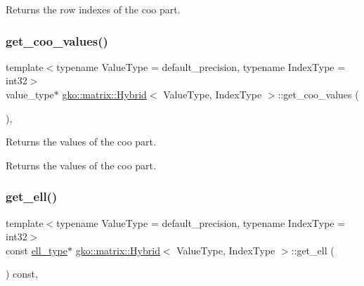 \begin{DoxyReturn}{Returns}
the row indexes of the coo part. 
\end{DoxyReturn}
\mbox{\label{classgko_1_1matrix_1_1Hybrid_a8513b46a3abb728b725fc26af81d09b9}} 
\subsubsection{\texorpdfstring{get\+\_\+coo\+\_\+values()}{get\_coo\_values()}}
{\footnotesize\ttfamily template$<$typename Value\+Type = default\+\_\+precision, typename Index\+Type = int32$>$ \\
value\+\_\+type$\ast$ \hyperlink{classgko_1_1matrix_1_1Hybrid}{gko\+::matrix\+::\+Hybrid}$<$ Value\+Type, Index\+Type $>$\+::get\+\_\+coo\+\_\+values (\begin{DoxyParamCaption}{ }\end{DoxyParamCaption})\hspace{0.3cm}{\ttfamily [inline]}, {\ttfamily [noexcept]}}



Returns the values of the coo part. 

\begin{DoxyReturn}{Returns}
the values of the coo part. 
\end{DoxyReturn}
\mbox{\label{classgko_1_1matrix_1_1Hybrid_afe9a3a9a801271d5ead4774fff7ffbd7}} 
\subsubsection{\texorpdfstring{get\+\_\+ell()}{get\_ell()}}
{\footnotesize\ttfamily template$<$typename Value\+Type = default\+\_\+precision, typename Index\+Type = int32$>$ \\
const \hyperlink{classgko_1_1matrix_1_1Ell}{ell\+\_\+type}$\ast$ \hyperlink{classgko_1_1matrix_1_1Hybrid}{gko\+::matrix\+::\+Hybrid}$<$ Value\+Type, Index\+Type $>$\+::get\+\_\+ell (\begin{DoxyParamCaption}{ }\end{DoxyParamCaption}) const\hspace{0.3cm}{\ttfamily [inline]}, {\ttfamily [noexcept]}}



